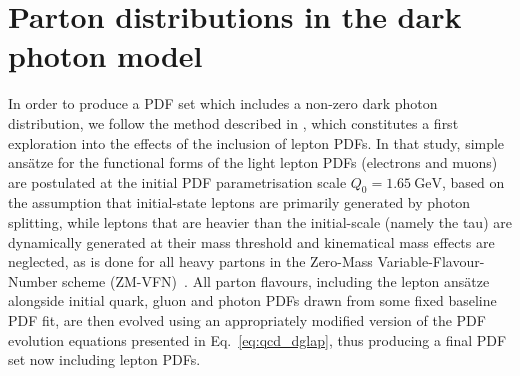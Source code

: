 \documentclass[withindex,glossary]{cam-thesis}
\begin{document}


%

\section{Parton distributions in the dark photon model}
\label{sec:dark_pdfs}
In order to produce a PDF set which includes a non-zero dark photon distribution,
we follow the method described in \cite{Bertone:2015lqa},
which constitutes a first exploration into the effects of the inclusion of lepton PDFs.
In that study, 
simple ans\"{a}tze for the functional forms of the light lepton PDFs (electrons and muons)
are postulated at the initial PDF parametrisation scale $Q_0 = 1.65\ \text{GeV}$, based on the assumption that
initial-state leptons are primarily generated by photon splitting, 
while leptons that are heavier than the initial-scale (namely the
tau) are dynamically generated at their mass threshold and
kinematical mass effects are neglected, as is done for all heavy
partons in the Zero-Mass Variable-Flavour-Number scheme (ZM-VFN)~\cite{Maltoni:2012pa,Bertone:2017djs}.  
%
All parton flavours, including the lepton ans\"{a}tze alongside initial quark,
gluon and photon PDFs drawn from some fixed baseline PDF fit, are then
evolved using an appropriately modified version of the PDF evolution equations presented
in Eq.~\eqref{eq:qcd_dglap}, thus producing
a final PDF set now including lepton PDFs. 
\end{document}
